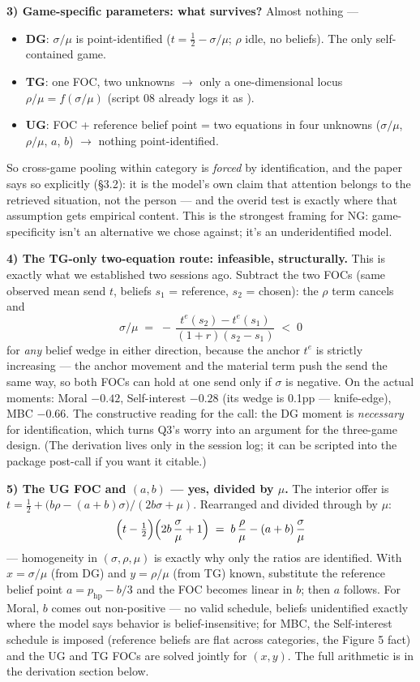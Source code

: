 \documentclass[11pt]{article}
\newcommand{\code}[1]{\path{#1}}
\begin{document}
\textbf{3) Game-specific parameters: what survives?} Almost nothing ---
\begin{itemize}
\item \textbf{DG}: $\sigma/\mu$ is point-identified ($t = \tfrac12 - \sigma/\mu$; $\rho$ idle, no beliefs). The only self-contained game.
\item \textbf{TG}: one FOC, two unknowns $\to$ only a one-dimensional locus $\rho/\mu = f(\sigma/\mu)$ (script 08 already logs it as \code{tg_locus}).
\item \textbf{UG}: FOC + reference belief point = two equations in four unknowns ($\sigma/\mu$, $\rho/\mu$, $a$, $b$) $\to$ nothing point-identified.
\end{itemize}
So cross-game pooling within category is \emph{forced} by identification, and the paper says so explicitly (\S3.2): it is the model's own claim that attention belongs to the retrieved situation, not the person --- and the overid test is exactly where that assumption gets empirical content. This is the strongest framing for NG: game-specificity isn't an alternative we chose against; it's an underidentified model.

\textbf{4) The TG-only two-equation route: infeasible, structurally.} This is exactly what we established two sessions ago. Subtract the two FOCs (same observed mean send $t$, beliefs $s_1$ = reference, $s_2$ = chosen): the $\rho$ term cancels and
\[
\sigma/\mu \;=\; -\,\frac{t^{e}(s_2) - t^{e}(s_1)}{(1+r)(s_2 - s_1)} \;<\; 0
\]
for \emph{any} belief wedge in either direction, because the anchor $t^{e}$ is strictly increasing --- the anchor movement and the material term push the send the same way, so both FOCs can hold at one send only if $\sigma$ is negative. On the actual moments: Moral $-0.42$, Self-interest $-0.28$ (its wedge is 0.1pp --- knife-edge), MBC $-0.66$. The constructive reading for the call: the DG moment is \emph{necessary} for identification, which turns Q3's worry into an argument for the three-game design. (The derivation lives only in the session log; it can be scripted into the package post-call if you want it citable.)

\textbf{5) The UG FOC and $(a,b)$ --- yes, divided by $\mu$.} The interior offer is $t = \tfrac12 + \bigl(b\rho - (a+b)\sigma\bigr)/(2b\sigma + \mu)$. Rearranged and divided through by $\mu$:
\[
\Bigl(t - \tfrac12\Bigr)\Bigl(2b\,\frac{\sigma}{\mu} + 1\Bigr) \;=\; b\,\frac{\rho}{\mu} - (a+b)\,\frac{\sigma}{\mu}
\]
--- homogeneity in $(\sigma, \rho, \mu)$ is exactly why only the ratios are identified. With $x = \sigma/\mu$ (from DG) and $y = \rho/\mu$ (from TG) known, substitute the reference belief point $a = p_{\mathrm{hp}} - b/3$ and the FOC becomes linear in $b$; then $a$ follows. For Moral, $b$ comes out non-positive --- no valid schedule, beliefs unidentified exactly where the model says behavior is belief-insensitive; for MBC, the Self-interest schedule is imposed (reference beliefs are flat across categories, the Figure 5 fact) and the UG and TG FOCs are solved jointly for $(x, y)$. The full arithmetic is in the derivation section below.
\end{document}

